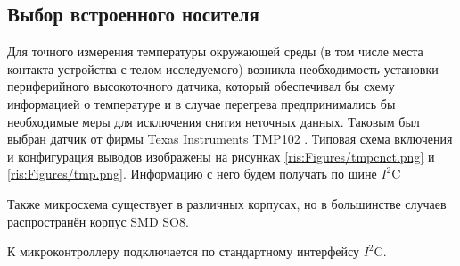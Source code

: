 \begin{sloppypar} %


\subsection{Выбор встроенного носителя}
Для точного измерения температуры окружающей среды (в том числе места контакта устройства с телом исследуемого) возникла необходимость установки периферийного высокоточного датчика, который обеспечивал бы схему информацией о температуре и в случае перегрева предпринимались бы необходимые меры для исключения снятия неточных данных. Таковым был выбран датчик от фирмы Texas Instruments TMP102 \cite{TMP102}. Типовая схема включения и конфигурация выводов изображены на рисунках \ref{ris:Figures/tmpcnct.png}  и \ref{ris:Figures/tmp.png}. Информацию с него будем получать по шине $I^2$C

Также микросхема существует в различных корпусах, но в большинстве случаев распространён корпус SMD SO8.

К микроконтроллеру подключается по стандартному интерфейсу $I^2$C.





\end{sloppypar}
